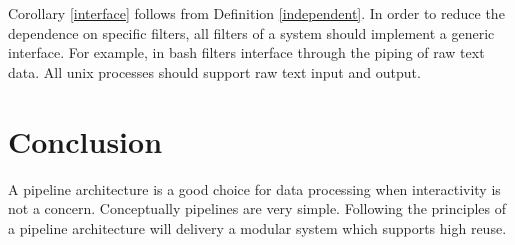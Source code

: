 Corollary \ref{interface} follows from Definition \ref{independent}.
In order to reduce the dependence on specific filters,
all filters of a system should implement a generic interface.
For example, in bash filters interface through the piping
of raw text data.
All unix processes should support raw text input and output.

\section{Conclusion}

A pipeline architecture is a good choice for data processing when interactivity is not a concern.
Conceptually pipelines are very simple.
Following the principles of a pipeline architecture will delivery a modular system which supports high reuse.
